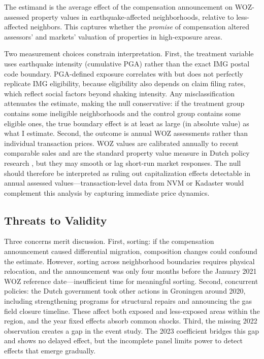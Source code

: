\documentclass[12pt]{article}
\begin{document}
The estimand is the average effect of the compensation announcement on WOZ-assessed property values in earthquake-affected neighborhoods, relative to less-affected neighbors. This captures whether the \emph{promise} of compensation altered assessors' and markets' valuation of properties in high-exposure areas.

Two measurement choices constrain interpretation. First, the treatment variable uses earthquake intensity (cumulative PGA) rather than the exact IMG postal code boundary. PGA-defined exposure correlates with but does not perfectly replicate IMG eligibility, because eligibility also depends on claim filing rates, which reflect social factors beyond shaking intensity. Any misclassification attenuates the estimate, making the null conservative: if the treatment group contains some ineligible neighborhoods and the control group contains some eligible ones, the true boundary effect is at least as large (in absolute value) as what I estimate. Second, the outcome is annual WOZ assessments rather than individual transaction prices. WOZ values are calibrated annually to recent comparable sales and are the standard property value measure in Dutch policy research \citep{hilber2016}, but they may smooth or lag short-run market responses. The null should therefore be interpreted as ruling out capitalization effects detectable in annual assessed values---transaction-level data from NVM or Kadaster would complement this analysis by capturing immediate price dynamics.

\subsection{Threats to Validity}

Three concerns merit discussion. First, sorting: if the compensation announcement caused differential migration, composition changes could confound the estimate. However, sorting across neighborhood boundaries requires physical relocation, and the announcement was only four months before the January 2021 WOZ reference date---insufficient time for meaningful sorting. Second, concurrent policies: the Dutch government took other actions in Groningen around 2020, including strengthening programs for structural repairs and announcing the gas field closure timeline. These affect both exposed and less-exposed areas within the region, and the year fixed effects absorb common shocks. Third, the missing 2022 observation creates a gap in the event study. The 2023 coefficient bridges this gap and shows no delayed effect, but the incomplete panel limits power to detect effects that emerge gradually.
\end{document}
